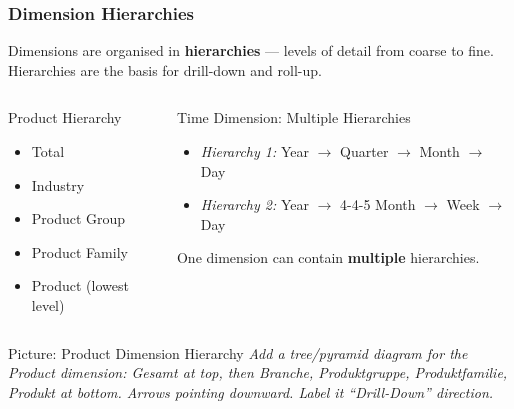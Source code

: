 \begin{frame}
  \frametitle{Dimension Hierarchies}

  Dimensions are organised in \textbf{hierarchies} --- levels of detail from
  coarse to fine. Hierarchies are the basis for drill-down and roll-up.

  \begin{columns}[T]
    \begin{block}{Product Hierarchy}
      \begin{itemize}
        \item Total
        \item Industry
        \item Product Group
        \item Product Family
        \item Product (lowest level)
      \end{itemize}
    \end{block}

    \begin{block}{Time Dimension: Multiple Hierarchies}
      \begin{itemize}
        \item \textit{Hierarchy 1:} Year $\to$ Quarter $\to$ Month $\to$ Day
        \item \textit{Hierarchy 2:} Year $\to$ 4-4-5 Month $\to$ Week $\to$ Day
      \end{itemize}
      One dimension can contain \textbf{multiple} hierarchies.
    \end{block}
  \end{columns}

  \begin{alertblock}{Picture: Product Dimension Hierarchy}
    \textit{Add a tree/pyramid diagram for the Product dimension:
    Gesamt at top, then Branche, Produktgruppe, Produktfamilie, Produkt at bottom.
    Arrows pointing downward. Label it ``Drill-Down'' direction.}
  \end{alertblock}
\end{frame}

